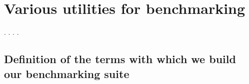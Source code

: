 \begin{coqdoccode}
\end{coqdoccode}
\section{Various utilities for benchmarking}

\begin{coqdoccode}
\coqdocnoindent
{}  . \coqdocnoindent
{}  .\coqdoceol
\coqdocnoindent
{} .\coqdoceol
\coqdocnoindent
{}  .\coqdoceol
\coqdocemptyline
\end{coqdoccode}
\subsection{Definition of the terms with which we build our benchmarking suite}

